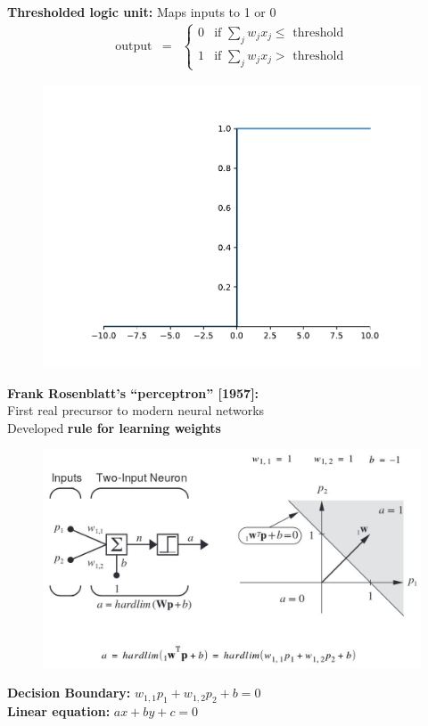 \documentclass[10pt, compress]{beamer}
\begin{document}
\begin{frame}
  \vspace*{1cm}
  \textbf{Thresholded logic unit:} Maps inputs to 1 or 0 \\
    \begin{eqnarray}
    \mbox{output} & = & \left\{ \begin{array}{ll}
    0 & \mbox{if } \sum_j w_j x_j \leq \mbox{ threshold} \\
    1 & \mbox{if } \sum_j w_j x_j > \mbox{ threshold}
    \end{array} \right.
    \nonumber
    \end{eqnarray}


    \begin{figure}
      \includegraphics[width=.7\linewidth]{imgs/step.pdf}
    \end{figure}
\end{frame}

\begin{frame}
  \textbf{Frank Rosenblatt’s “perceptron” [1957]:} \\First real precursor to modern neural networks \\
  Developed \textbf{rule for learning weights}

  \vspace{-.5cm}
  \begin{figure}
    \includegraphics[width=.8\linewidth]{imgs/perceptron_1}
  \end{figure}
  \vspace{-.5cm}
  \textbf{Decision Boundary:} $w_{1,1}p_1 + w_{1,2}p_2 + b = 0$ \\
  \textbf{Linear equation:} $ax + by + c = 0$
\end{frame}
\end{document}
